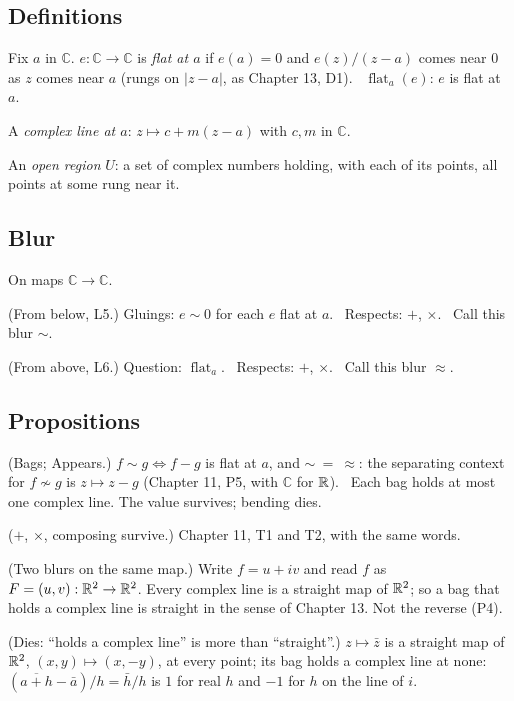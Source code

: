 \subsection*{Definitions}

\begin{lines}
\item[\lab{D1}] Fix $a$ in $\mathbb{C}$. $e : \mathbb{C} \to \mathbb{C}$ is \emph{flat at $a$} if $e(a) = 0$ and $e(z)/(z - a)$ comes near $0$ as $z$ comes near $a$ (rungs on $|z - a|$, as Chapter 13, D1). \ $\operatorname{flat}_a(e)$: $e$ is flat at $a$.
\item[\lab{D2}] A \emph{complex line at $a$}: $z \mapsto c + m(z - a)$ with $c, m$ in $\mathbb{C}$.
\item[\lab{D3}] An \emph{open region} $U$: a set of complex numbers holding, with each of its points, all points at some rung near it.
\end{lines}

\subsection*{Blur}

On maps $\mathbb{C} \to \mathbb{C}$.

\begin{lines}
\item[\lab{B1}] (From below, L5.) Gluings: $e \sim 0$ for each $e$ flat at $a$. \ Respects: $+$, $\times$. \ Call this blur $\sim$.
\item[\lab{B2}] (From above, L6.) Question: $\operatorname{flat}_a$. \ Respects: $+$, $\times$. \ Call this blur $\approx$.
\end{lines}

\subsection*{Propositions}

\begin{lines}
\item[\lab{P1}] (Bags; Appears.) $f \sim g \iff f - g$ is flat at $a$, and $\sim\ =\ \approx$: the separating context for $f \not\sim g$ is $z \mapsto z - g$ (Chapter 11, P5, with $\mathbb{C}$ for $\mathbb{R}$). \ Each bag holds at most one complex line. The value survives; bending dies.
\item[\lab{P2}] ($+$, $\times$, composing survive.) Chapter 11, T1 and T2, with the same words.
\item[\lab{P3}] (Two blurs on the same map.) Write $f = u + iv$ and read $f$ as $F = (u, v) : \mathbb{R}^2 \to \mathbb{R}^2$. Every complex line is a straight map of $\mathbb{R}^2$; so a bag that holds a complex line is straight in the sense of Chapter 13. Not the reverse (P4).
\item[\lab{P4}] (Dies: ``holds a complex line'' is more than ``straight''.) $z \mapsto \bar z$ is a straight map of $\mathbb{R}^2$, $(x, y) \mapsto (x, -y)$, at every point; its bag holds a complex line at none: $(\overline{a + h} - \bar a)/h = \bar h / h$ is $1$ for real $h$ and $-1$ for $h$ on the line of $i$.
\end{lines}

